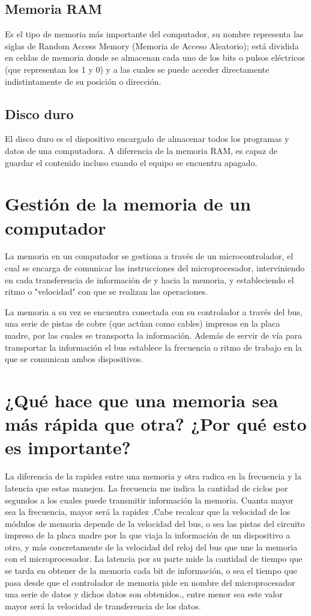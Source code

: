 \documentclass{article}
\begin{document}
\subsection{Memoria RAM}
Es el tipo de memoria más importante del computador, su nombre representa las siglas de Random Access Memory (Memoria de Acceso Aleatorio); está dividida en celdas de memoria donde se almacenan cada uno de los bits o pulsos eléctricos (que representan los 1 y 0) y a las cuales se puede acceder directamente indistintamente de su posición o dirección.\cite{rebollo2011memoria}
\subsection{Disco duro}
El disco duro es el dispositivo encargado de almacenar todos los programas y datos de una computadora. A diferencia de la memoria RAM, es capaz de guardar el contenido incluso cuando el equipo se encuentra apagado.\cite{stallings2006organizacion}
\section{Gestión de la memoria de un computador} \label{contenido}
La memoria en un computador se gestiona a través de un microcontrolador, el cual se encarga de comunicar las instrucciones del microprocesador, interviniendo en cada transferencia de información de y hacia la memoria, y estableciendo el ritmo o "velocidad" con que se realizan las operaciones.  

La memoria  a su vez se encuentra conectada con su controlador a través del bus, una serie de pistas de cobre (que actúan como cables) impresas en la placa madre, por las cuales se transporta la información. Además de servir de vía para transportar la información el bus establece la frecuencia o ritmo de trabajo en la que se comunican ambos dispositivos.\cite{youbioit.com}


\section{¿Qué hace que una memoria sea más rápida que otra? ¿Por qué esto es importante? 
} \label{contenido}
%
La diferencia de la rapidez entre una memoria y otra radica en la frecuencia y la latencia que estas manejen. La frecuencia me indica la cantidad de ciclos por segundos a los cuales puede transmitir información la memoria. Cuanta mayor sea la frecuencia, mayor será la rapidez .Cabe recalcar que la velocidad de los módulos de memoria depende de la velocidad del bus, o sea las pistas del circuito impreso de la placa madre por la que viaja la información de un dispositivo a otro, y más concretamente de la velocidad del reloj del bus que une la memoria con el microprocesador. La latencia por su parte mide la cantidad de tiempo que se tarda en obtener de la memoria cada bit de información, o sea el tiempo que pasa desde que el controlador de memoria pide en nombre del microprocesador una serie de datos y dichos datos son obtenidos., entre menor sea este valor mayor será la velocidad de transferencia de los datos.\cite{youbioit.com}
\end{document}
